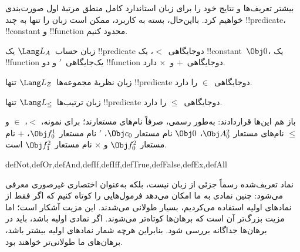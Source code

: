 \documentclass[../../../include/open-logic-section]{subfiles}
\begin{document}
بیشتر تعریف‌ها و نتایج خود را برای زبان استاندارد کامل منطق مرتبهٔ اول
صورت‌بندی خواهیم کرد. بااین‌حال، بسته به کاربرد، ممکن است زبان را تنها به
چند !!{predicate}، !!{constant} و !!{function} محدود کنیم.

\begin{ex}
زبان حساب~$\Lang L_A$ یک !!{predicate} دوجایگاهی~$<$، یک
!!{constant}~$\Obj 0$، یک !!{function} یک‌جایگاهی~$\prime$ و دو
!!{function} دوجایگاهی~$+$ و~$\times$ دارد.
\end{ex}

\begin{ex}
زبان نظریهٔ مجموعه‌ها~$\Lang L_Z$ تنها !!{predicate} دوجایگاهی~$\in$ را
دارد.
\end{ex}

\begin{ex}
زبان ترتیب‌ها~$\Lang L_\le$ تنها !!{predicate} دوجایگاهی~$\le$ را دارد.
\end{ex}

باز هم این‌ها قراردادند: به‌طور رسمی، صرفاً نام‌های مستعارند؛ برای نمونه،
$<$، $\in$ و $\le$ نام‌های مستعار $\Obj A^2_0$، $\Obj 0$ نام مستعار
$\Obj c_0$، $\prime$ نام مستعار $\Obj f^1_0$، $+$ نام مستعار $\Obj f^2_0$
و $\times$ نام مستعار $\Obj f^2_1$ است.


\begin{tagblock}{defNot,defOr,defAnd,defIf,defIff,defTrue,defFalse,defEx,defAll}
\begin{explain}
نماد تعریف‌شده رسماً جزئی از زبان نیست، بلکه به‌عنوان اختصاری غیرصوری
معرفی می‌شود: چنین نمادی به ما امکان می‌دهد فرمول‌هایی را کوتاه کنیم که
اگر فقط از نمادهای اولیه استفاده می‌کردیم، بسیار طولانی می‌شدند. این مزیت
آشکار است؛ اما مزیت بزرگ‌تر آن است که برهان‌ها کوتاه‌تر می‌شوند. اگر نمادی
اولیه باشد، باید در برهان‌ها جداگانه بررسی شود. بنابراین هرچه شمار نمادهای
اولیه بیشتر باشد، برهان‌های ما طولانی‌تر خواهند بود.
\end{explain}
\end{tagblock}
\end{document}
